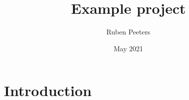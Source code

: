 \documentclass{article}
\title{Example project}
\author{Ruben Peeters }
\date{May 2021}
\begin{document}
\maketitle

\section{Introduction}
\newpage
\tableofcontents
\listoffigures
\newpage


\end{document}
